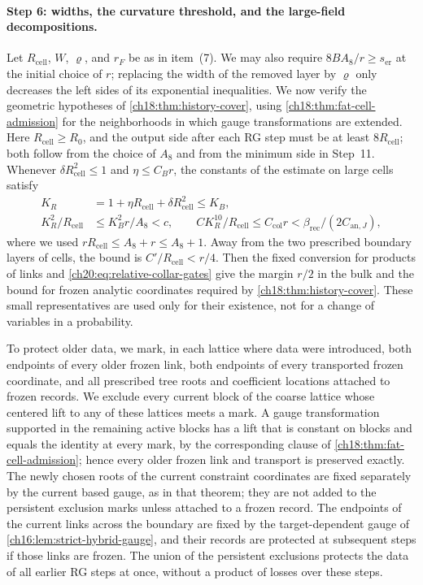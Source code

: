 \paragraph{Step 6: widths, the curvature threshold, and the large-field decompositions.}
Let $R_{\mathrm{cell}}$, $W$, $\varrho$, and $r_F$ be as in item~(7). We may also require $8BA_8/r\ge s_{\mathrm{er}}$ at the initial choice of $r$; replacing the width of the removed layer by $\varrho$ only decreases the left sides of its exponential inequalities. We now verify the geometric hypotheses of \cref{ch18:thm:history-cover}, using \cref{ch18:thm:fat-cell-admission} for the neighborhoods in which gauge transformations are extended. Here $R_{\mathrm{cell}}\ge R_0$, and the output side after each RG step must be at least $8R_{\mathrm{cell}}$; both follow from the choice of $A_8$ and from the minimum side in Step~11. Whenever $\delta R_{\mathrm{cell}}^2\le1$ and $\eta\le C_Br$, the constants of the estimate on large cells satisfy
\begin{equation}\label{ch20:eq:fat-cell-specialization}
 \begin{split}
 K_R&=1+\eta R_{\mathrm{cell}}+\delta R_{\mathrm{cell}}^2\le K_B,\\
 K_R^2/R_{\mathrm{cell}}&\le K_B^2r/A_8<c,\qquad
 CK_R^{10}/R_{\mathrm{cell}}\le C_{\mathrm{col}}r<\beta_{\mathrm{rec}}/(2C_{\mathrm{an},J}),
 \end{split}
\end{equation}
where we used $rR_{\mathrm{cell}}\le A_8+r\le A_8+1$. Away from the two prescribed boundary layers of cells, the bound is $C'/R_{\mathrm{cell}}<r/4$. Then the fixed conversion for products of links and \eqref{ch20:eq:relative-collar-gates} give the margin $r/2$ in the bulk and the bound for frozen analytic coordinates required by \cref{ch18:thm:history-cover}. These small representatives are used only for their existence, not for a change of variables in a probability.

To protect older data, we mark, in each lattice where data were introduced, both endpoints of every older frozen link, both endpoints of every transported frozen coordinate, and all prescribed tree roots and coefficient locations attached to frozen records. We exclude every current block of the coarse lattice whose centered lift to any of these lattices meets a mark. A gauge transformation supported in the remaining active blocks has a lift that is constant on blocks and equals the identity at every mark, by the corresponding clause of \cref{ch18:thm:fat-cell-admission}; hence every older frozen link and transport is preserved exactly. The newly chosen roots of the current constraint coordinates are fixed separately by the current based gauge, as in that theorem; they are not added to the persistent exclusion marks unless attached to a frozen record. The endpoints of the current links across the boundary are fixed by the target-dependent gauge of \cref{ch16:lem:strict-hybrid-gauge}, and their records are protected at subsequent steps if those links are frozen. The union of the persistent exclusions protects the data of all earlier RG steps at once, without a product of losses over these steps.

